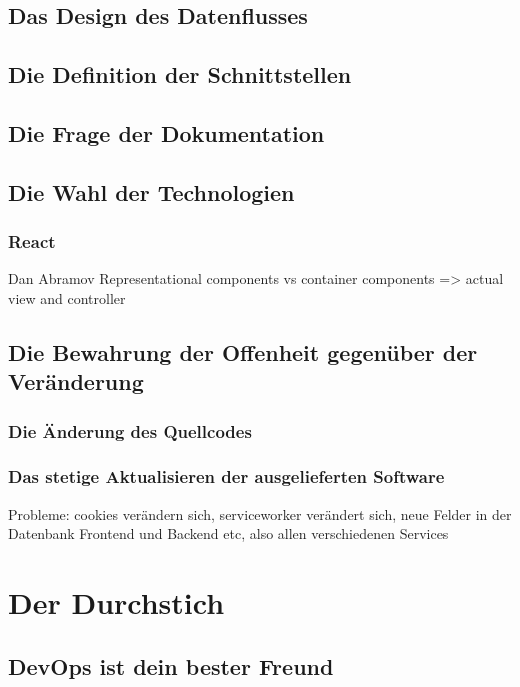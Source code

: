 \section{Das Design des Datenflusses}
\label{sec:das-design-des-datenflusses}

\section{Die Definition der Schnittstellen}
\label{sec:die-definition-der-schnittstellen}

\section{Die Frage der Dokumentation}

\section{Die Wahl der Technologien}

\subsection{React}
Dan Abramov Representational components vs container components => actual view and controller


\section{Die Bewahrung der Offenheit gegenüber der Veränderung}
\label{sec:die-bewahrung-der-offenheit-gegenueber-der-veraenderung}

\subsection{Die Änderung des Quellcodes}

\subsection{Das stetige Aktualisieren der ausgelieferten Software}
Probleme: cookies verändern sich, serviceworker verändert sich, neue Felder in der Datenbank
Frontend und Backend etc, also allen verschiedenen Services

\chapter{Der Durchstich}

\section{DevOps ist dein bester Freund}

